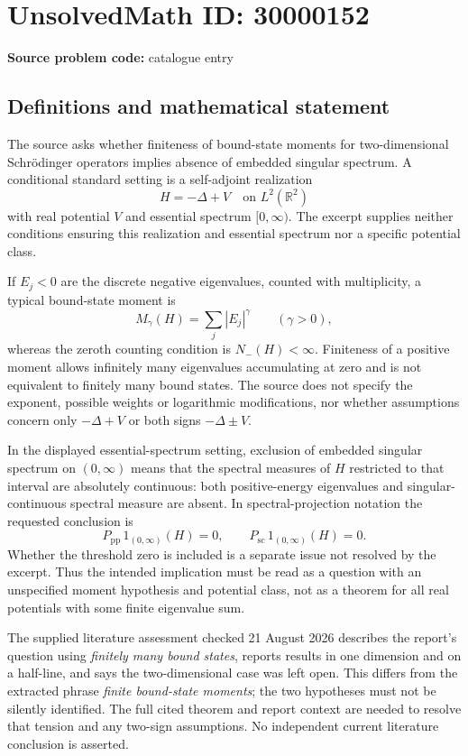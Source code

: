 \documentclass[11pt]{article}
\newcommand{\R}{\mathbb{R}}
\begin{document}
\section*{UnsolvedMath ID: 30000152}
\textbf{Source problem code:} catalogue entry
\subsection{Definitions and mathematical statement}
The source asks whether finiteness of bound-state moments for two-dimensional Schr\"odinger operators implies absence of embedded singular spectrum. A conditional standard setting is a self-adjoint realization
\[
 H=-\Delta+V\quad\text{on }L^2(\R^2)
\]
with real potential $V$ and essential spectrum $[0,\infty)$. The excerpt supplies neither conditions ensuring this realization and essential spectrum nor a specific potential class.

If $E_j<0$ are the discrete negative eigenvalues, counted with multiplicity, a typical bound-state moment is
\[
 M_\gamma(H)=\sum_j|E_j|^\gamma\qquad(\gamma>0),
\]
whereas the zeroth counting condition is $N_-(H)<\infty$. Finiteness of a positive moment allows infinitely many eigenvalues accumulating at zero and is not equivalent to finitely many bound states. The source does not specify the exponent, possible weights or logarithmic modifications, nor whether assumptions concern only $-\Delta+V$ or both signs $-\Delta\pm V$.

In the displayed essential-spectrum setting, exclusion of embedded singular spectrum on $(0,\infty)$ means that the spectral measures of $H$ restricted to that interval are absolutely continuous: both positive-energy eigenvalues and singular-continuous spectral measure are absent. In spectral-projection notation the requested conclusion is
\[
 P_{\mathrm{pp}}\,1_{(0,\infty)}(H)=0,
 \qquad P_{\mathrm{sc}}\,1_{(0,\infty)}(H)=0.
\]
Whether the threshold zero is included is a separate issue not resolved by the excerpt. Thus the intended implication must be read as a question with an unspecified moment hypothesis and potential class, not as a theorem for all real potentials with some finite eigenvalue sum.

The supplied literature assessment checked 21 August 2026 describes the report's question using \emph{finitely many bound states}, reports results in one dimension and on a half-line, and says the two-dimensional case was left open. This differs from the extracted phrase \emph{finite bound-state moments}; the two hypotheses must not be silently identified. The full cited theorem and report context are needed to resolve that tension and any two-sign assumptions. No independent current literature conclusion is asserted.
\end{document}
